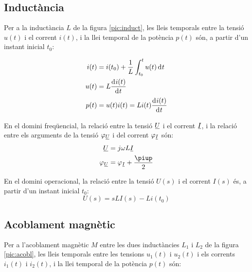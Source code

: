 \subsection{Inductància} 

Per a la inductància $L$ de la figura \vref{pic:induct},
les lleis temporals entre la tensió $u(t)$ i el corrent $i(t)$, i la llei temporal
de la potència $p(t)$ són,  a partir d'un instant inicial $t_0$:

\hfill
\begin{minipage}[b]{5cm}
	
	\label{pic:induct}
\end{minipage}
\hfill
\begin{minipage}[b][3.8cm][t]{8cm}
	\begin{align}
		i(t) &= i(t_0) + \frac{1}{L} \int_{t_0}^t u(t) \diff t \\
		u(t) &= L \deriv{i(t)}{t} \\
		p(t) &= u(t) i(t) = L i(t) \deriv{i(t)}{t}
	\end{align}
\end{minipage}

En el domini freqüencial, la relació entre la tensió $\cmplx{U}$ i el corrent $\cmplx{I}$, i la relació entre els arguments de la tensió $\varphi_{\cmplx{U}}$ i del corrent $\varphi_{\cmplx{I}}$ són:
\begin{align}
	\cmplx{U} &= j \omega L \cmplx{I} \\
	\varphi_{\cmplx{U}} &= \varphi_{\cmplx{I}} + \frac{\piup}{2}
\end{align}

 En el domini operacional, la relació entre la tensió $U(s)$ i el corrent $I(s)$ és, a partir d'un instant inicial $t_0$:
\begin{equation}
	U(s) = s L I(s) - L i(t_0)
\end{equation}


\subsection{Acoblament magnètic}\label{sec:acobl-mag} 

Per a l'acoblament magnètic $M$ entre les dues
inductàncies $L_1$ i $L_2$ de la figura \vref{pic:acobl}, les lleis temporals entre les
tensions $u_1(t)$ i $u_2(t)$ i els corrents $i_1(t)$ i $i_2(t)$,  i la llei temporal
de la potència $p(t)$ són:

